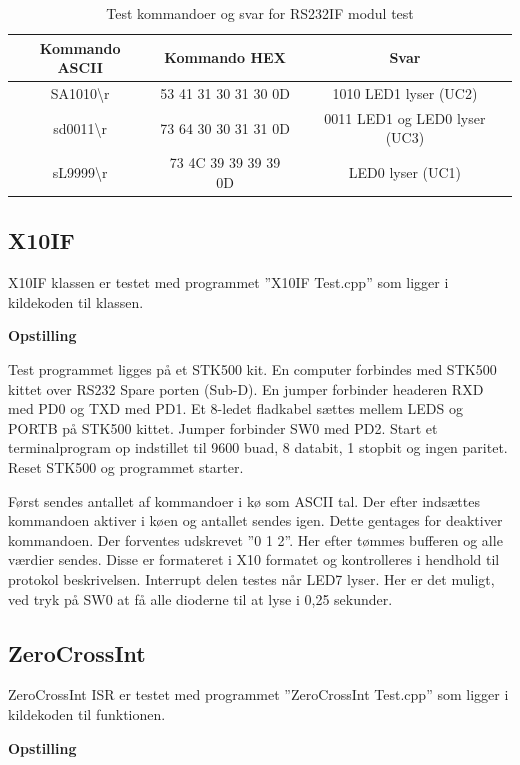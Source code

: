\begin{table}[h]
	\caption{Test kommandoer og svar for RS232IF modul test}
	\centering
	\begin{tabular}{|c|c|c|}
		\hline 
		\textbf{Kommando ASCII} & \textbf{Kommando HEX} & \textbf{Svar} \\ 
		\hline 
		SA1010\textbackslash r & 53 41 31 30 31 30 0D & 1010 LED1 lyser (UC2) \\ 
		\hline 
		sd0011\textbackslash r & 73 64 30 30 31 31 0D & 0011 LED1 og LED0 lyser (UC3) \\ 
		\hline 
		sL9999\textbackslash r & 73 4C 39 39 39 39 0D & LED0 lyser (UC1) \\ 
		\hline 
	\end{tabular} 
	\label{table:Test_RS232IF_kommandoer}
\end{table}

\subsection{X10IF}
X10IF klassen er testet med programmet ''X10IF Test.cpp'' som ligger i kildekoden til klassen.

\textbf{Opstilling}

Test programmet ligges på et STK500 kit.
En computer forbindes med STK500 kittet over RS232 Spare porten (Sub-D).
En jumper forbinder headeren RXD med PD0 og TXD med PD1. Et 8-ledet fladkabel sættes mellem LEDS og PORTB på STK500 kittet. Jumper forbinder SW0 med PD2.
Start et terminalprogram op indstillet til 9600 buad, 8 databit, 1 stopbit og ingen paritet.
Reset STK500 og programmet starter.

Først sendes antallet af kommandoer i kø som ASCII tal. Der efter indsættes kommandoen aktiver i køen og antallet sendes igen. Dette gentages for deaktiver kommandoen. Der forventes udskrevet ''0 1 2''.
Her efter tømmes bufferen og alle værdier sendes. Disse er formateret i X10 formatet og kontrolleres i hendhold til protokol beskrivelsen.
Interrupt delen testes når LED7 lyser. Her er det muligt, ved tryk på SW0 at få alle dioderne til at lyse i 0,25 sekunder.
 
\subsection{ZeroCrossInt}
ZeroCrossInt ISR er testet med programmet ''ZeroCrossInt Test.cpp'' som ligger i kildekoden til funktionen.

\textbf{Opstilling}

